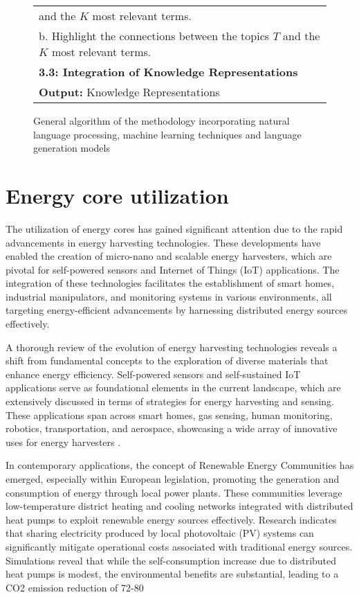 \documentclass[runningheads]{llncs}
\begin{document}
\begin{figure*}[!h]
\begin{tabular}{l}
		\quad \quad and the $K$ most relevant terms.\\
		\quad \quad b. Highlight the connections between the topics $T$ and the $K$ most relevant terms.\\
		\quad \textbf{3.3: Integration of Knowledge Representations}\\
		\hline
		\textbf{Output:} Knowledge Representations \\
		\hline
	\end{tabular}
	\caption{\centering General algorithm of the methodology incorporating natural language processing, machine learning techniques and language generation models}
	\label{tab:Algorithm}
\end{figure*}


\section{Energy core utilization}
The utilization of energy cores has gained significant attention due to the rapid advancements in energy harvesting technologies. These developments have enabled the creation of micro-nano and scalable energy harvesters, which are pivotal for self-powered sensors and Internet of Things (IoT) applications. The integration of these technologies facilitates the establishment of smart homes, industrial manipulators, and monitoring systems in various environments, all targeting energy-efficient advancements by harnessing distributed energy sources effectively.

A thorough review of the evolution of energy harvesting technologies reveals a shift from fundamental concepts to the exploration of diverse materials that enhance energy efficiency. Self-powered sensors and self-sustained IoT applications serve as foundational elements in the current landscape, which are extensively discussed in terms of strategies for energy harvesting and sensing. These applications span across smart homes, gas sensing, human monitoring, robotics, transportation, and aerospace, showcasing a wide array of innovative uses for energy harvesters \cite{Long_2021}.

In contemporary applications, the concept of Renewable Energy Communities has emerged, especially within European legislation, promoting the generation and consumption of energy through local power plants. These communities leverage low-temperature district heating and cooling networks integrated with distributed heat pumps to exploit renewable energy sources effectively. Research indicates that sharing electricity produced by local photovoltaic (PV) systems can significantly mitigate operational costs associated with traditional energy sources. Simulations reveal that while the self-consumption increase due to distributed heat pumps is modest, the environmental benefits are substantial, leading to a CO2 emission reduction of 72-80%
\end{document}
